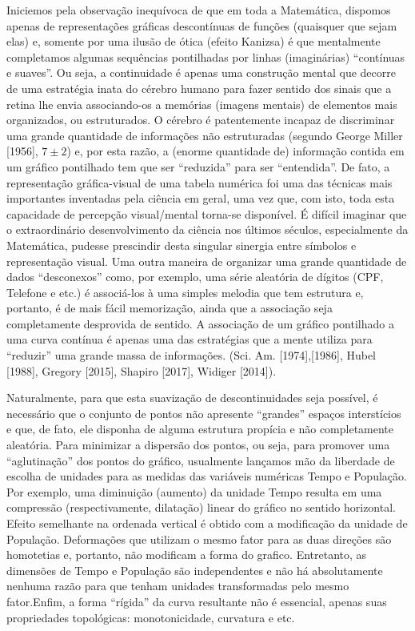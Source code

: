     Iniciemos pela observação inequívoca de que em toda a Matemática, dispomos apenas de representações gráficas descontínuas de funções (quaisquer que sejam elas) e, somente por uma ilusão de ótica (efeito Kanizsa) é que mentalmente completamos algumas sequências pontilhadas por linhas (imaginárias) ``contínuas e suaves''. Ou seja, a continuidade é apenas uma construção mental que decorre de uma estratégia inata do cérebro humano para fazer sentido dos sinais que a retina lhe envia associando-os a memórias (imagens mentais) de elementos mais organizados, ou estruturados. O cérebro é patentemente incapaz de discriminar uma grande quantidade de informações não estruturadas (segundo George Miller [1956], \(7 \pm 2\)) e, por esta razão, a (enorme quantidade de) informação contida em um gráfico pontilhado tem que ser ``reduzida'' para ser ``entendida''. De fato, a representação gráfica-visual de uma tabela numérica foi uma das técnicas mais importantes inventadas pela ciência em geral, uma vez que, com isto, toda esta capacidade de percepção visual/mental torna-se disponível. É difícil imaginar que o extraordinário desenvolvimento da ciência nos últimos séculos, especialmente da Matemática, pudesse prescindir desta singular sinergia entre símbolos e representação visual. Uma outra maneira de organizar uma grande quantidade de dados ``desconexos'' como, por exemplo, uma série aleatória de dígitos (CPF, Telefone e etc.) é associá-los à uma simples melodia que tem estrutura e, portanto, é de mais fácil memorização, ainda que a associação seja completamente desprovida de sentido. A associação de um gráfico pontilhado a uma curva contínua é apenas uma das estratégias que a mente utiliza para ``reduzir'' uma grande massa de informações. (Sci. Am. [1974],[1986], Hubel [1988], Gregory [2015], Shapiro [2017], Widiger [2014]).

    Naturalmente, para que esta suavização de descontinuidades seja possível, é necessário que o conjunto de pontos não apresente ``grandes'' espaços interstícios e que, de fato, ele disponha de alguma estrutura propícia e não completamente aleatória. Para minimizar a dispersão dos pontos, ou seja, para promover uma ``aglutinação'' dos pontos do gráfico, usualmente lançamos mão da liberdade de escolha de unidades para as medidas das variáveis numéricas Tempo e População. Por exemplo, uma diminuição (aumento) da unidade Tempo resulta em uma compressão (respectivamente, dilatação) linear do gráfico no sentido horizontal. Efeito semelhante na ordenada vertical é obtido com a modificação da unidade de População. Deformações que utilizam o mesmo fator para as duas direções são homotetias e, portanto, não modificam a forma do grafico. Entretanto, as dimensões de Tempo e População são independentes e não há absolutamente nenhuma razão para que tenham unidades transformadas pelo mesmo fator.Enfim, a forma ``rígida'' da curva resultante não é essencial, apenas suas propriedades topológicas: monotonicidade, curvatura e etc.

